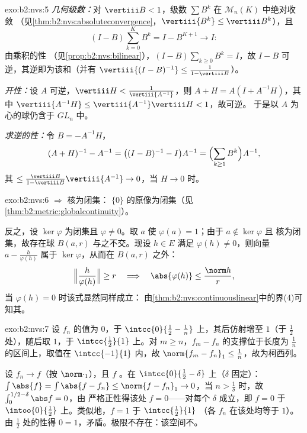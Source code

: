 \begin{solution}{exo:b2:nvs:5}
\emph{几何级数：}对 $\vertiii B < 1$，级数 $\sum
B^k$ 在 $\mathcal{M}_n(K)$ 中绝对收敛
（见\cref{thm:b2:nvs:absoluteconvergence}，$\vertiii{B^k} \leq
\vertiii B^k$），且
\[
(I - B)\sum_{k=0}^{K} B^k = I - B^{K+1} \longrightarrow I :
\]
由乘积的性
（见\cref{prop:b2:nvs:bilinear}），$(I - B)\sum_{k\geq0} B^k = I$，故
$I - B$ 可逆，其逆即为该和（并有
$\vertiii{(I-B)^{-1}} \leq \frac{1}{1 - \vertiii B}$）。

\emph{开性：}设 $A$ 可逆，$\vertiii H <
\frac{1}{\vertiii{A^{-1}}}$，则 $A + H = A(I + A^{-1}H)$，其中
$\vertiii{A^{-1}H} \leq \vertiii{A^{-1}}\vertiii H < 1$，故可逆。
于是以 $A$ 为心的球仍含于 $GL_n$ 中。

\emph{求逆的性：}令 $B = -A^{-1}H$，
\[
(A + H)^{-1} - A^{-1} = \bigl((I - B)^{-1} - I\bigr)A^{-1}
= \Bigl(\sum_{k \geq 1} B^k\Bigr) A^{-1},
\]
其 $\leq \frac{\vertiii B}{1 - \vertiii B}\vertiii{A^{-1}}
\to 0$，当 $H \to 0$ 时。
\end{solution}

\begin{solution}{exo:b2:nvs:6}
 $\Rightarrow$ 核为闭集：
$\{0\}$ 的原像为闭集（见\cref{thm:b2:metric:globalcontinuity}）。

反之，设 $\ker\varphi$ 为闭集且 $\varphi \neq 0$。取
$a$ 使 $\varphi(a) = 1$；由于 $a \notin \ker\varphi$ 且
核为闭集，故存在球 $B(a, r)$ 与之不交。现设 $h \in E$
满足 $\varphi(h) \neq 0$，则向量 $a - \frac{h}{\varphi(h)}$
属于 $\ker\varphi$，从而在 $B(a, r)$ 之外：
\[
\Bigl\Vert \frac{h}{\varphi(h)} \Bigr\Vert \geq r
\quad\Longrightarrow\quad
\abs{\varphi(h)} \leq \frac{\norm h}{r},
\]
当 $\varphi(h) = 0$ 时该式显然同样成立：
由\cref{thm:b2:nvs:continuouslinear}中的界(4)可知其。
\end{solution}

\begin{solution}{exo:b2:nvs:7}
设 $f_n$ 的值为 $0$，于 $\intcc{0}{\frac12 - \frac1n}$ 上，其后仿射增至
$1$（于 $\frac12$ 处），随后取 $1$，于 $\intcc{\frac12}{1}$ 上。对 $m
\geq n$，$f_m - f_n$ 的支撑位于长度为
$\frac1n$ 的区间上，取值在 $\intcc{-1}{1}$ 内，故 $\norm{f_m - f_n}_1 \leq
\frac1n$，故为柯西列。

设 $f_n \to f$（按 $\norm\cdot_1$），且 $f$ 。在
$\intcc{0}{\frac12 - \delta}$ 上（$\delta$ 固定）：$\int \abs{f} =
\int\abs{f - f_n} \leq \norm{f - f_n}_1 \to 0$，当 $n >
\frac1\delta$ 时，故 $\int_0^{1/2 - \delta}\abs f = 0$，由
严格正性得该处 $f = 0$——对每个 $\delta$ 成立，即 $f = 0$ 于
$\intoo{0}{\frac12}$ 上。类似地，$f = 1$ 于 $\intcc{\frac12}{1}$
（各 $f_n$ 在该处均等于 $1$）。由 $\frac12$ 处的性得 $0 =
1$，矛盾。极限不存在：该空间不。
\end{solution}

